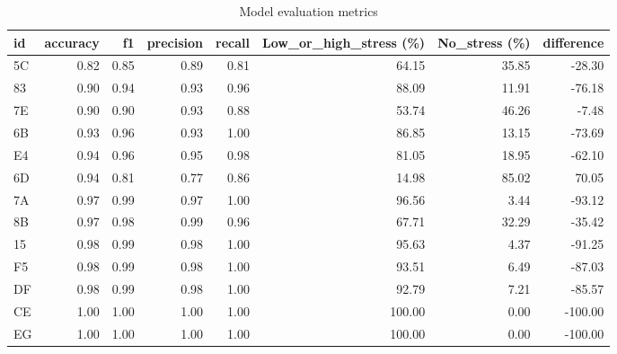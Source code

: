 \begin{table}
\centering
\caption{Model evaluation metrics}
\begin{tabular}{lrrrrrrr}
\toprule
id &  accuracy &   f1 &  precision &  recall &  Low\_or\_high\_stress (\%) &  No\_stress (\%) &  difference \\
\midrule
5C &      0.82 & 0.85 &       0.89 &    0.81 &                   64.15 &          35.85 &      -28.30 \\
83 &      0.90 & 0.94 &       0.93 &    0.96 &                   88.09 &          11.91 &      -76.18 \\
7E &      0.90 & 0.90 &       0.93 &    0.88 &                   53.74 &          46.26 &       -7.48 \\
6B &      0.93 & 0.96 &       0.93 &    1.00 &                   86.85 &          13.15 &      -73.69 \\
E4 &      0.94 & 0.96 &       0.95 &    0.98 &                   81.05 &          18.95 &      -62.10 \\
6D &      0.94 & 0.81 &       0.77 &    0.86 &                   14.98 &          85.02 &       70.05 \\
7A &      0.97 & 0.99 &       0.97 &    1.00 &                   96.56 &           3.44 &      -93.12 \\
8B &      0.97 & 0.98 &       0.99 &    0.96 &                   67.71 &          32.29 &      -35.42 \\
15 &      0.98 & 0.99 &       0.98 &    1.00 &                   95.63 &           4.37 &      -91.25 \\
F5 &      0.98 & 0.99 &       0.98 &    1.00 &                   93.51 &           6.49 &      -87.03 \\
DF &      0.98 & 0.99 &       0.98 &    1.00 &                   92.79 &           7.21 &      -85.57 \\
CE &      1.00 & 1.00 &       1.00 &    1.00 &                  100.00 &           0.00 &     -100.00 \\
EG &      1.00 & 1.00 &       1.00 &    1.00 &                  100.00 &           0.00 &     -100.00 \\
\bottomrule
\end{tabular}
\end{table}
